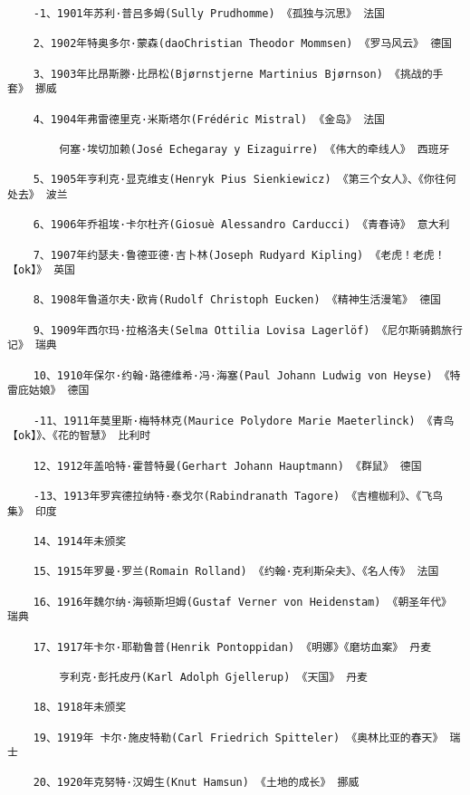 \documentclass[UTF8]{../RepresentationUniverse}
\begin{document}
\begin{lstlisting}
    -1、1901年苏利·普吕多姆(Sully Prudhomme) 《孤独与沉思》 法国

    2、1902年特奥多尔·蒙森(daoChristian Theodor Mommsen) 《罗马风云》 德国
    
    3、1903年比昂斯滕·比昂松(Bjørnstjerne Martinius Bjørnson) 《挑战的手套》 挪威
    
    4、1904年弗雷德里克·米斯塔尔(Frédéric Mistral) 《金岛》 法国
    
        何塞·埃切加赖(José Echegaray y Eizaguirre) 《伟大的牵线人》 西班牙
    
    5、1905年亨利克·显克维支(Henryk Pius Sienkiewicz) 《第三个女人》、《你往何处去》 波兰
    
    6、1906年乔祖埃·卡尔杜齐(Giosuè Alessandro Carducci) 《青春诗》 意大利
    
    7、1907年约瑟夫·鲁德亚德·吉卜林(Joseph Rudyard Kipling) 《老虎！老虎！【ok】》 英国
    
    8、1908年鲁道尔夫·欧肯(Rudolf Christoph Eucken) 《精神生活漫笔》 德国
    
    9、1909年西尔玛·拉格洛夫(Selma Ottilia Lovisa Lagerlöf) 《尼尔斯骑鹅旅行记》 瑞典
    
    10、1910年保尔·约翰·路德维希·冯·海塞(Paul Johann Ludwig von Heyse) 《特雷庇姑娘》 德国
    
    -11、1911年莫里斯·梅特林克(Maurice Polydore Marie Maeterlinck) 《青鸟【ok】》、《花的智慧》 比利时
    
    12、1912年盖哈特·霍普特曼(Gerhart Johann Hauptmann) 《群鼠》 德国
    
    -13、1913年罗宾德拉纳特·泰戈尔(Rabindranath Tagore) 《吉檀枷利》、《飞鸟集》 印度
    
    14、1914年未颁奖
    
    15、1915年罗曼·罗兰(Romain Rolland) 《约翰·克利斯朵夫》、《名人传》 法国
    
    16、1916年魏尔纳·海顿斯坦姆(Gustaf Verner von Heidenstam) 《朝圣年代》 瑞典
    
    17、1917年卡尔·耶勒鲁普(Henrik Pontoppidan) 《明娜》《磨坊血案》 丹麦
    
        亨利克·彭托皮丹(Karl Adolph Gjellerup) 《天国》 丹麦
    
    18、1918年未颁奖
    
    19、1919年 卡尔·施皮特勒(Carl Friedrich Spitteler) 《奥林比亚的春天》 瑞士
    
    20、1920年克努特·汉姆生(Knut Hamsun) 《土地的成长》 挪威
    

\end{lstlisting}
\end{document}

